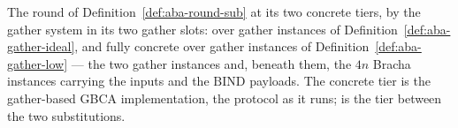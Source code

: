 \begin{definition}
  \label{def:aba-gbca-gather-low}
  \leanok
  The round of Definition~\ref{def:aba-round-sub} at its two concrete tiers, by the gather system in its two gather slots: over gather instances of Definition~\ref{def:aba-gather-ideal}, and fully concrete over gather instances of Definition~\ref{def:aba-gather-low} --- the two gather instances and, beneath them, the $4n$ Bracha instances carrying the inputs and the $\mathrm{BIND}$ payloads.
  The concrete tier  is the gather-based GBCA implementation, the protocol as it runs;  is the tier between the two substitutions.
\end{definition}
